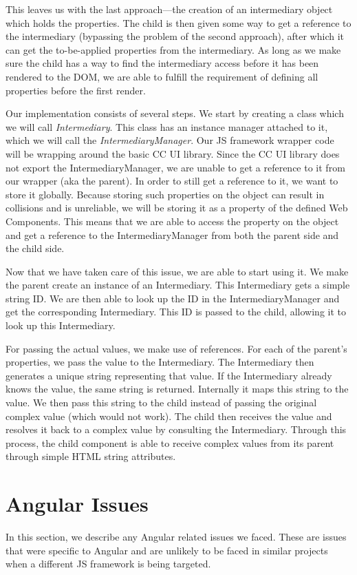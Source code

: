 {  This leaves us with the last approach—the creation of an intermediary object which holds the properties. The child is then given some way to get a reference to the intermediary (bypassing the problem of the second approach), after which it can get the to-be-applied properties from the intermediary. As long as we make sure the child has a way to find the intermediary access before it has been rendered to the DOM, we are able to fulfill the requirement of defining all properties before the first render.
}{
  Our implementation consists of several steps. We start by creating a class which we will call \emph{Intermediary}. This class has an instance manager attached to it, which we will call the \emph{IntermediaryManager}. Our JS framework wrapper code will be wrapping around the basic CC UI library. Since the CC UI library does not export the IntermediaryManager, we are unable to get a reference to it from our wrapper (aka the parent). In order to still get a reference to it, we want to store it globally. Because storing such properties on the  object can result in collisions and is unreliable, we will be storing it as a property of the defined Web Components. This means that we are able to access the  property on the   object and get a reference to the IntermediaryManager from both the parent side and the child side.

  Now that we have taken care of this issue, we are able to start using it. We make the parent create an instance of an Intermediary. This Intermediary gets a simple string ID\@. We are then able to look up the ID in the IntermediaryManager and get the corresponding Intermediary. This ID is passed to the child, allowing it to look up this Intermediary.

  For passing the actual values, we make use of references. For each of the parent's properties, we pass the value to the Intermediary. The Intermediary then generates a unique string representing that value. If the Intermediary already knows the value, the same string is returned. Internally it maps this string to the value. We then pass this string to the child instead of passing the original complex value (which would not work). The child then receives the value and resolves it back to a complex value by consulting the Intermediary. Through this process, the child component is able to receive complex values from its parent through simple HTML string attributes.
}

\section{Angular Issues}
In this section, we describe any Angular related issues we faced. These are issues that were specific to Angular and are unlikely to be faced in similar projects when a different JS framework is being targeted.

